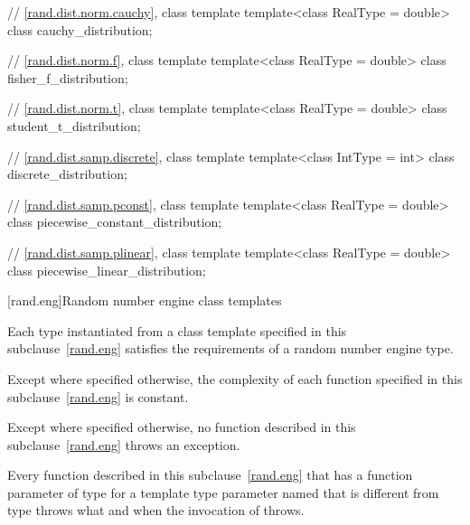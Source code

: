\begin{codeblock}
{  // \ref{rand.dist.norm.cauchy}, class template 
  template<class RealType = double>
    class cauchy_distribution;

  // \ref{rand.dist.norm.f}, class template 
  template<class RealType = double>
    class fisher_f_distribution;

  // \ref{rand.dist.norm.t}, class template 
  template<class RealType = double>
    class student_t_distribution;

  // \ref{rand.dist.samp.discrete}, class template 
  template<class IntType = int>
    class discrete_distribution;

  // \ref{rand.dist.samp.pconst}, class template 
  template<class RealType = double>
    class piecewise_constant_distribution;

  // \ref{rand.dist.samp.plinear}, class template 
  template<class RealType = double>
    class piecewise_linear_distribution;
}
\end{codeblock}%
%




[rand.eng]{Random number engine class templates}%

\pnum
Each type instantiated
from a class template specified in this subclause~\ref{rand.eng}
satisfies the requirements
of a random number engine type.

\pnum
Except where specified otherwise,
the complexity of each function
specified in this subclause~\ref{rand.eng}
is constant.

\pnum
Except where specified otherwise,
no function described in this subclause~\ref{rand.eng}
throws an exception.

\pnum
Every function described in this subclause~\ref{rand.eng}
that has a function parameter  of type 
for a template type parameter named 
that is different from type 
throws what and when the invocation of  throws.

